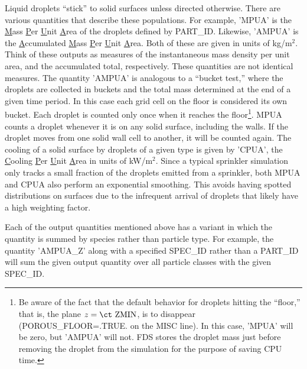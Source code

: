 \documentclass[11pt]{book}
\begin{document}
Liquid droplets ``stick'' to solid surfaces unless directed otherwise. There are various quantities that describe these populations. For example, {\ct 'MPUA'} is the \underline{M}ass \underline{P}er \underline{U}nit \underline{A}rea of the droplets defined by {\ct PART\_ID}. Likewise, {\ct 'AMPUA'} is the \underline{A}ccumulated \underline{M}ass \underline{P}er \underline{U}nit \underline{A}rea. Both of these are given in units of kg/m$^2$. Think of these outputs as measures of the instantaneous mass density per unit area, and the accumulated total, respectively. These quantities are not identical measures.  The quantity {\ct 'AMPUA'} is analogous to a ``bucket test,'' where the droplets are collected in buckets and the total mass determined at the end of a given time period. In this case each grid cell on the floor is considered its own bucket.  Each droplet is counted only once when it reaches the floor\footnote{Be aware of the fact that the default behavior for droplets hitting the ``floor,'' that is, the plane $z=\hbox{\ct ZMIN}$, is to disappear ({\ct POROUS\_FLOOR=.TRUE.} on the {\ct MISC} line). In this case, {\ct 'MPUA'} will be zero, but {\ct 'AMPUA'} will not. FDS stores the droplet mass just before removing the droplet from the simulation for the purpose of saving CPU time.}. {\ct MPUA} counts a droplet whenever it is on any solid surface, including the walls. If the droplet moves from one solid wall cell to another, it will be counted again. The cooling of a solid surface by droplets of a given type is given by {\ct 'CPUA'}, the \underline{C}ooling \underline{P}er \underline{U}nit \underline{A}rea in units of kW/m$^2$. Since a typical sprinkler simulation only tracks a small fraction of the droplets emitted from a sprinkler, both {\ct MPUA} and {\ct CPUA} also perform an exponential smoothing. This avoids having spotted distributions on surfaces due to the infrequent arrival of droplets that likely have a high weighting factor.

Each of the output quantities mentioned above has a variant in which the quantity is summed by species rather than particle type. For example, the quantity {\ct 'AMPUA\_Z'} along with a specified {\ct SPEC\_ID} rather than a {\ct PART\_ID} will sum the given output quantity over all particle classes with the given {\ct SPEC\_ID}.
\end{document}
